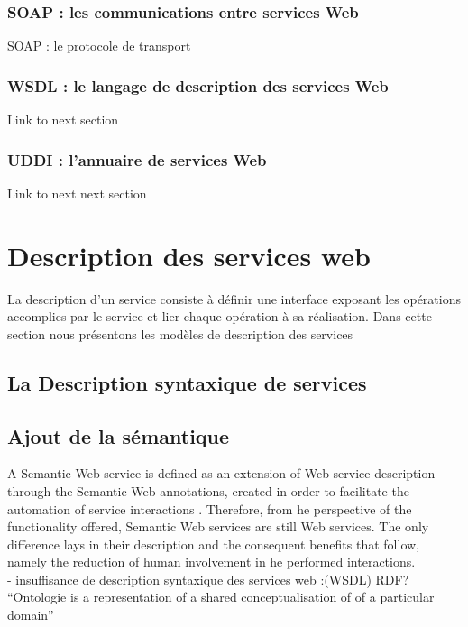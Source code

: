 	 \subsubsection{SOAP : les communications entre services Web } 
	     SOAP : le protocole de transport 
	 \subsubsection{WSDL : le langage de description des services Web}
	     Link to next section
	 \subsubsection{UDDI : l’annuaire de services Web }
	     Link to next next section

	     \newpage
\section{Description des services web} 
    La description d’un service consiste à définir une interface exposant les opérations accomplies par le service et 
    lier chaque opération à sa réalisation. Dans cette section nous présentons les modèles de description des services
    	\subsection{La Description syntaxique de services}
        \subsection{Ajout de la sémantique}
	    A Semantic Web service is defined as an extension of Web service description through the Semantic Web annotations,
	    created in order to facilitate the automation of service interactions . Therefore, from 
	    he perspective of the functionality offered, Semantic Web services are still Web services. The only difference lays
	    in their description and the consequent benefits that follow, namely the reduction of human involvement in 
	    he performed interactions.\\

	    - insuffisance de description syntaxique des services web :(WSDL)
	     RDF? \cite{lassila1999resource}\\
	    ``Ontologie is a representation of a shared conceptualisation of of a particular domain'' 

